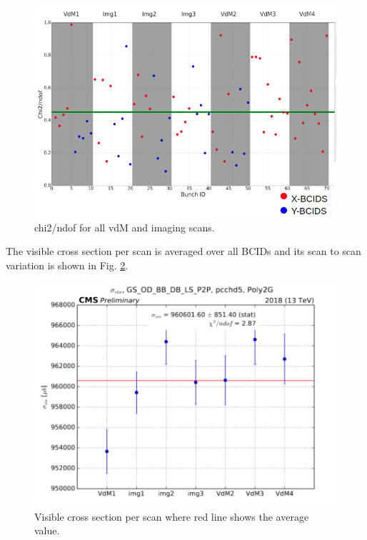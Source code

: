 \begin{figure}[h]
    \centering
    \includegraphics[width=1\textwidth]{ashish_thesis/fit_quality_chisquare.png}
    \caption[Fit quality]{chi2/ndof for all vdM and imaging scans.}
    \label{fig:fitquality}
\end{figure}


The visible cross section per scan is averaged over all BCIDs and its scan to scan variation is shown in Fig. \ref{fig:sigmaperscan}.


\begin{figure}[h]
    \centering
    \includegraphics[width=1\textwidth]{ashish_thesis/sigma_vis_per_scan.png}
    \caption[PCC visible cross section]{Visible cross section per scan where red line shows the average value.}
    \label{fig:sigmaperscan}
\end{figure}


